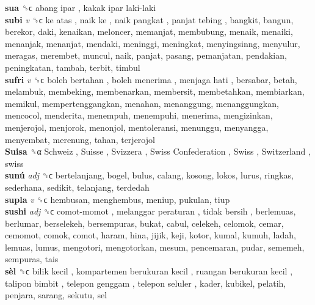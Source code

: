 \textbf{sua} ␝ϲ   abang ipar ,  kakak ipar laki-laki   \\
\textbf{subi} \emph{v}  ␝ϲ   ke atas ,  naik ke ,  naik pangkat ,  panjat tebing , bangkit, bangun, berekor, daki, kenaikan, meloncer, memanjat, membubung, menaik, menaiki, menanjak, menanjat, mendaki, meninggi, meningkat, menyingsinng, menyulur, meragas, merembet, muncul, naik, panjat, pasang, pemanjatan, pendakian, peningkatan, tambah, terbit, timbul  \\
\textbf{sufri} \emph{v}  ␝ϲ   boleh bertahan ,  boleh menerima ,  menjaga hati , bersabar, betah, melambuk, membeking, membenarkan, membersit, membetahkan, membiarkan, memikul, mempertenggangkan, menahan, menanggung, menanggungkan, mencocol, menderita, menempuh, menempuhi, menerima, mengizinkan, menjerojol, menjorok, menonjol, mentoleransi, menunggu, menyangga, menyembat, merenung, tahan, terjerojol  \\
\textbf{Suisa} ␝α   Schweiz ,  Suisse ,  Svizzera ,  Swiss Confederation ,  Swiss ,  Switzerland , swiss  \\
\textbf{sunú} \emph{adj}  ␝ϲ  bertelanjang, bogel, bulus, calang, kosong, lokos, lurus, ringkas, sederhana, sedikit, telanjang, terdedah  \\
\textbf{supla} \emph{v}  ␝ϲ  hembusan, menghembus, meniup, pukulan, tiup  \\
\textbf{sushi} \emph{adj}  ␝ϲ   comot-momot ,  melanggar peraturan ,  tidak bersih , berlemuas, berlumar, berselekeh, bersempuras, bukat, cabul, celekeh, celomok, cemar, cemomot, comok, comot, haram, hina, jijik, keji, kotor, kumal, kumuh, ladah, lemuas, lumus, mengotori, mengotorkan, mesum, pencemaran, pudar, sememeh, sempuras, tais  \\
\textbf{sèl} ␝ϲ   bilik kecil ,  kompartemen berukuran kecil ,  ruangan berukuran kecil ,  talipon bimbit ,  telepon genggam ,  telepon seluler , kader, kubikel, pelatih, penjara, sarang, sekutu, sel  \\

